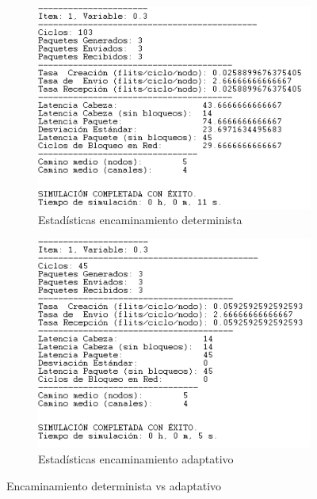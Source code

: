 \begin{itemize}
\begin{figure}[hbt]
  \begin{subfigure}{0.48\textwidth}
    \includegraphics[width=\linewidth]{figs/determinista-estadisticas.png}
    \caption{Estadísticas encaminamiento determinista}
  \end{subfigure}
  \hspace{0.25cm}
  \begin{subfigure}{0.48\textwidth}
    \includegraphics[width=\linewidth]{figs/adaptativo-estadisticas.png}
    \caption{Estadísticas encaminamiento adaptativo}
  \end{subfigure}
  \caption{Encaminamiento determinista vs adaptativo}
  \label{fig:detvsadap}
\end{figure}


\end{itemize}
